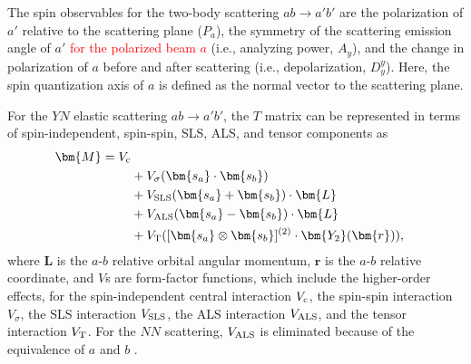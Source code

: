 The spin observables for the two-body scattering $ab\to a'b'$ are the polarization of $a'$ relative to the scattering plane ($P_a$), the symmetry of the scattering emission angle of $a'$ \textcolor{red}{for the polarized beam $a$} (i.e., analyzing power, $A_y$), and the change in polarization of $a$ before and after scattering (i.e., depolarization, $D^y_y$). Here, the spin quantization axis of $a$ is defined as the normal vector to the scattering plane. 

\begin{comment}
Several models describe the $YN$ interaction. For example, there are 
\begin{itemize}
  \item {\bf Extended-Soft Core model (ESC16)} describes the short-range repulsion derived from the quark-Pauli effect phenomenologically using Pomeron exchange, etc.
  \item {\bf Quark-cluster model (QCM)} is a theory of interquark interactions to describe the repulsion.
  \item {\bf Chiral EFT} has the potential to be composed of meson exchange and contact interactions (parameterized by low-energy constants (LECs), the values of which need to be determined by fitting the scattering data) with the contribution of pseudoscalar octuplets. 
\end{itemize}
Compared to the abundance of $NN$ scattering data, $YN$ scattering data are still scarce. A robust model dependence appears in the amount of spin observed in SU(3)$_f$ space with the introduction of $s$ quarks in the model above. We plan to constrain these models by experimentally measuring the $ \Lp$ spin observables.
\end{comment}

For the $YN$ elastic scattering $ab\to a'b'$, the $T$ matrix can be represented in terms of spin-independent, spin-spin, SLS, ALS, and tensor components as
\begin{align}
  \bm{M} = V_{\rm c} \\
  &+ V_{\sigma}(\bm{s_a} \cdot \bm{s_b}) \\
  &+ V_{{\rm SLS}}(\bm{s_a} + \bm{s_b}) \cdot \bm{L} \\
  &+ V_{{\rm ALS}}(\bm{s_a} - \bm{s_b}) \cdot \bm{L} \\
  &+V_{{\rm T}}([\bm{s_a} \otimes \bm{s_b}]^{(2)} \cdot \bm{Y_2}(\bm{r})),
\end{align}
where $\bm{L}$ is the $a$-$b$ relative orbital angular momentum, $\bm{r}$ is the $a$-$b$ relative coordinate, and $V$s are form-factor functions, which include the higher-order effects, for the spin-independent central interaction $V_{\rm c}$, the spin-spin interaction $V_{\sigma}$, the SLS interaction $V_{\rm SLS}$, the ALS interaction $V_{\rm ALS}$, and the tensor interaction $V_{\rm T}$. %
For the $NN$ scattering, $V_{\rm ALS}$ is eliminated because of the equivalence of $a$ and $b$ \cite{Ishikawa-2004}. 

